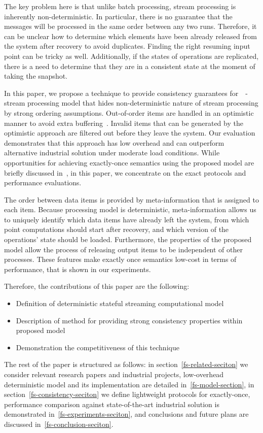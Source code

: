 The key problem here is that unlike batch processing, stream processing is inherently non-deterministic. In particular, there is no guarantee that the messages will be processed in the same order between any two runs. Therefore, it can be unclear how to determine which elements have been already released from the system after recovery to avoid duplicates. Finding the right resuming input point can be tricky as well. Additionally, if the states of operations are replicated, there is a need to determine that they are in a consistent state at the moment of taking the snapshot. 

In this paper, we propose a technique to provide consistency guarantees for~\FlameStream\ - stream processing model that hides non-deterministic nature of stream processing by strong ordering assumptions. Out-of-order items are handled in an optimistic manner to avoid extra buffering~\cite{we2018seim}. Invalid items that can be generated by the optimistic approach are filtered out before they leave the system. Our evaluation demonstrates that this approach has low overhead and can outperform alternative industrial solution under moderate load conditions. While opportunities for achieving exactly-once semantics using the proposed model are briefly discussed in~\cite{we2018beyondmr}, in this paper, we concentrate on the exact protocols and performance evaluations.

The order between data items is provided by meta-information that is assigned to each item. Because processing model is deterministic, meta-information allows us to uniquely identify which data items have already left the system, from which point computations should start after recovery, and which version of the operations' state should be loaded. Furthermore, the properties of the proposed model allow the process of releasing output items to be independent of other processes. These features make exactly once semantics low-cost in terms of performance, that is shown in our experiments. 

Therefore, the contributions of this paper are the following: 
\begin{itemize}
    \item Definition of deterministic stateful streaming computational model 
    \item Description of method for providing strong consistency properties within proposed model 
    \item Demonstration the competitiveness of this technique
\end{itemize}

The rest of the paper is structured as follows: in section~\ref{fs-related-seciton} we consider relevant research papers and industrial projects, low-overhead deterministic model and its implementation are detailed in~\ref{fs-model-section}, in section~\ref{fs-consistency-seciton} we define lightweight protocols for exactly-once, performance comparison against state-of-the-art industrial solution is demonstrated in~\ref{fs-experiments-seciton}, and conclusions and future plans are discussed in~\ref{fs-conclusion-seciton}.

